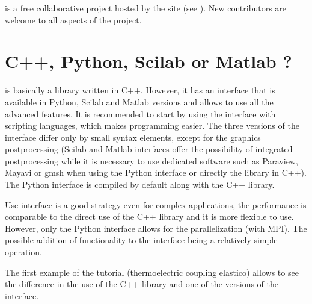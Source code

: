 \documentclass[a4paper,11pt,english]{sphinxmanual}
\begin{document}
 is a free collaborative project hosted by the  site (see ). New contributors are welcome to all aspects of the project.


\section{C++, Python, Scilab or Matlab ?}
\label{\detokenize{tutorial/intro:c-python-scilab-or-matlab}}
 is basically a library written in C++. However, it has an interface that is available in Python, Scilab and Matlab  versions and allows to use all the advanced features. It is recommended to start by using the interface with scripting languages, which makes programming easier. The three versions of the interface differ only by small syntax elements, except for the graphics post\sphinxhyphen{}processing (Scilab and Matlab interfaces offer the possibility of integrated post\sphinxhyphen{}processing while it is necessary to use dedicated software such as Paraview, Mayavi or gmsh when using the Python interface or directly the library in C++). The Python interface is compiled by default along with the C++ library.

Use  interface is a good strategy even for complex applications, the performance is comparable to the direct use of the C++ library and it is more flexible to use. However, only the Python interface allows for the parallelization (with MPI). The possible addition of functionality to the interface being a relatively simple operation.

The first example of the tutorial (thermo\sphinxhyphen{}electric coupling elastico) allows to see the difference in the use of the C++ library and one of the versions of the interface.
\end{document}
